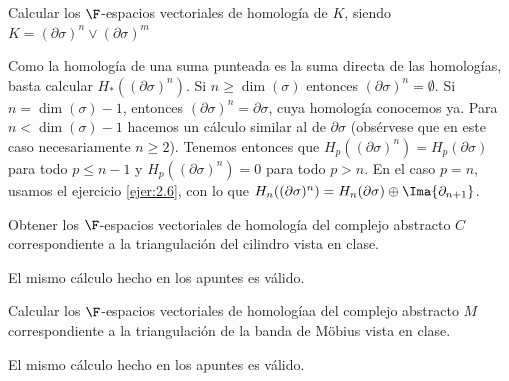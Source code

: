 \documentclass[twoside]{article}
\begin{document}
\newpage

\begin{ejercicio}{2.9}
Calcular los $\F$-espacios vectoriales de homología de $K$, siendo $K =
(\partial\sigma)^n
∨
(\partial σ)^m$
\end{ejercicio}
\begin{solucion}
Como la homología de una suma punteada es la suma directa de las homologías, basta calcular $H_*((\partial\sigma)^n)$. Si $n\geq \dim(\sigma)$ entonces $(\partial\sigma)^n=\emptyset$. Si $n=\dim(\sigma)-1$, entonces $(\partial\sigma)^n=\partial\sigma$, cuya homología conocemos ya. Para $n<\dim(\sigma)-1$ hacemos un cálculo similar al de $\partial\sigma$ (obsérvese que en este caso necesariamente $n\geq 2$). Tenemos entonces que $H_p((\partial\sigma)^n)=H_p(\partial\sigma)$ para todo $p\leq n-1$ y $H_p((\partial\sigma)^n)=0$ para todo $p>n$. En el caso $p=n$, usamos el ejercicio \ref{ejer:2.6}, con lo que $H_n((\partial\sigma)^n)=H_n(\partial\sigma)\oplus\Ima{\partial_{n+1}}$.
\end{solucion}

\newpage

\begin{ejercicio}{2.10}
Obtener los $\F$-espacios vectoriales de homología del complejo abstracto
$C$ correspondiente a la triangulación del cilindro vista en clase.
\end{ejercicio}
\begin{solucion}
El mismo cálculo hecho en los apuntes es válido.
\end{solucion}

\newpage

\begin{ejercicio}{2.11}
Calcular los $\F$-espacios vectoriales de homologíaa del complejo abstracto
$M$ correspondiente a la triangulación de la banda de Möbius vista en clase.
\end{ejercicio}
\begin{solucion}
El mismo cálculo hecho en los apuntes es válido.
\end{solucion}

\newpage
\end{document}
